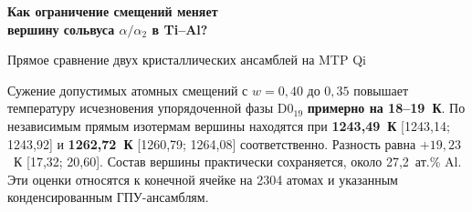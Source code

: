 \documentclass[11pt,a4paper]{article}
\begin{document}
\thispagestyle{plain}
{\sffamily\bfseries\fontsize{22}{24}\selectfont\color{ink}Как ограничение смещений меняет\\вершину сольвуса \(\alpha/\alpha_2\) в Ti--Al?\par}
{\large\sffamily\color{muted}Прямое сравнение двух кристаллических ансамблей на MTP Qi\par}
\vspace{1mm}{\color{loose}\rule{\linewidth}{1.1pt}}
Сужение допустимых атомных смещений с \(w=0{,}40\) до \(0{,}35\) повышает температуру исчезновения упорядоченной фазы D0$_{19}$ \textbf{примерно на 18--19~К}. По независимым прямым изотермам вершины находятся при \textbf{1243,49~К} [1243,14; 1243,92] и \textbf{1262,72~К} [1260,79; 1264,08] соответственно. Разность равна \(+19{,}23\)~К [17,32; 20,60]. Состав вершины практически сохраняется, около 27,2~ат.\% Al. Эти оценки относятся к конечной ячейке на 2304 атомах и указанным конденсированным ГПУ-ансамблям.
\end{document}
